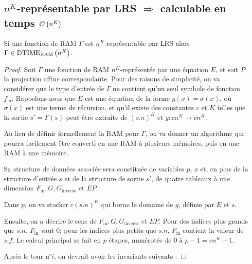 \begin{appendices}
		

		
		
		\subsection{$n^K$-représentable par LRS $\Rightarrow$ calculable en temps $\mathcal{O}\left( n^K \right)$}
		\label{subsec:LRS_implique_poly}
		
		\begin{conj}
			\label{conj:rep_LRS_calc_n_K}
			Si une fonction de RAM $\Gamma$ est $n^K$-représentable par LRS alors $\Gamma \in \text{DTIME}_{\text{RAM}}\left( n^{K} \right)$.
		\end{conj}
		
		\begin{proof}
			{
				\newcommand{\Fin}{F_{\text{in}}}
				\newcommand{\Ginv}{G_{\text{inverse}}}
				
				Soit $\Gamma$ une fonction de RAM $n^K$-représentée par une équation $E$, et soit $P$ la projection affine correspondante. Pour des raisons de simplicité, on va considérer que le type d'entrée de $\Gamma$ ne contient qu'un seul symbole de fonction $f_{\text{in}}$. Rappelons-nous que $E$ est une équation de la forme $g(x) = \sigma(x)$, où $\sigma(x)$ est une terme de récursion, et qu'il existe des constantes $c$ et $K$ telles que la sortie $s' = \Gamma(s)$ peut être extraite de $(s.n)^K$ et $g : cn^K \to cn^K$.
				
				Au lieu de définir formellement la RAM pour $\Gamma$, on va donner un algorithme qui pourra facilement être converti en une RAM à plusieurs mémoires, puis en une RAM à une mémoire.
				
				Sa structure de données associée sera constituée de variables $p$, $x$ et, en plus de la structure d'entrée $s$ et de la structure de sortie $s'$, de quatre tableaux à une dimension $\Fin, G, \Ginv$ et $EP$. 
				
				Dans $p$, on va stocker $c(s.n)^K$ qui borne le domaine de $g$, définie par $E$ et $s$.

				Ensuite, on a décrire le sens de $F_{\text{in}}, G, G_{\text{inverse}}$ et $EP$. Pour des indices plus grands que $s.n$, $F_{\text{in}}$ vaut $0$; pour les indices plus petits que $s.n$, $\Fin$ contient la valeur de $s.f$. Le calcul principal se fait en $p$ étapes, numérotés de $0$ à $p-1 = cn^K-1$.
				
				Après le tour n°$i$, on devrait avoir les invariants suivants : 
				
}
\end{proof}
\end{appendices}

